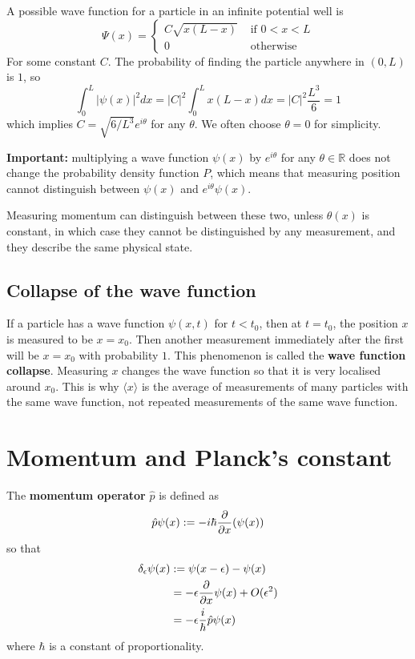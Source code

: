 \begin{example}
	A possible wave function for a particle in an infinite potential well is
	\[
		\Psi(x) = \begin{cases}
			C \sqrt{x(L - x)} & \text{ if } 0 < x < L \\
			0 & \text{ otherwise }
		\end{cases}
	\]
	For some constant $C$. The probability of finding the particle anywhere in $(0, L)$ is $1$, so
	\[
		\int_{0}^{L} |\psi(x)|^2 dx = |C|^2 \int_{0}^{L} x(L - x) dx = |C|^2 \frac{L^3}{6} = 1
	\]
	which implies $C = \sqrt{6 / L^3} e^{i \theta}$ for any $\theta$. We often choose $\theta = 0$ for simplicity.
\end{example}

\begin{remark}
	\textbf{Important:} multiplying a wave function $\psi(x)$ by $e^{i \theta}$ for any $\theta \in \mathbb{R}$ does not change the probability density function $P$, which means that measuring position cannot distinguish between $\psi(x)$ and $e^{i \theta} \psi(x)$.
	
	Measuring momentum can distinguish between these two, unless $\theta(x)$ is constant, in which case they cannot be distinguished by any measurement, and they describe the same physical state.
\end{remark}

\subsection{Collapse of the wave function}

\begin{definition}
	If a particle has a wave function $\psi(x, t)$ for $t < t_0$, then at $t = t_0$, the position $x$ is measured to be $x = x_0$. Then another measurement immediately after the first will be $x = x_0$ with probability $1$. This phenomenon is called the \textbf{wave function collapse}. Measuring $x$ changes the wave function so that it is very localised around $x_0$. This is why $\langle x \rangle$ is the average of measurements of many particles with the same wave function, not repeated measurements of the same wave function.
\end{definition}

\section{Momentum and Planck's constant}

\begin{definition}
	The \textbf{momentum operator} $\hat{p}$ is defined as
	\[
		\hat{p} \psi(x) := -i \hbar \diffp{}{x} (\psi(x))
	\]
	so that
	\[
		\begin{aligned}
			\delta_{\epsilon} \psi(x)
				& := \psi(x - \epsilon) - \psi(x) \\
				& = -\epsilon \diffp{}{x} \psi(x) + O(\epsilon^2) \\
				& = -\epsilon \frac{i}{\hbar} \hat{p} \psi(x)
		\end{aligned}
	\]
	where $\hbar$ is a constant of proportionality.
\end{definition}

